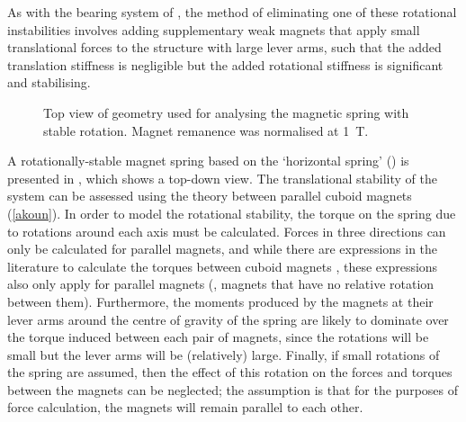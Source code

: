 \documentclass[11pt,a4paper]{memoir}
\begin{document}
As with the bearing system of \textcite{delamare1994-ietm}, the method of eliminating one of these rotational instabilities involves adding supplementary weak magnets that apply small translational forces to the structure with large lever arms, such that the added translation stiffness is negligible but the added rotational stiffness is significant and stabilising.


\begin{figure}
  \begin{subfigure}[0.4]
  \end{subfigure}\hfil
  \begin{subfigure}[0.4]
  \end{subfigure}
  \caption[Geometry used for analysing the magnetic spring with stable rotation.]{Top view of geometry used for analysing the magnetic spring with stable rotation. Magnet remanence was normalised at \SI{1}{T}.}
\end{figure}

A rotationally-stable magnet spring based on the `horizontal spring' () is presented in , which shows a top-down view.
The translational stability of the system can be assessed using the theory between parallel cuboid magnets (\eqref{akoun}).
In order to model the rotational stability, the torque on the spring due to rotations around each axis must be calculated.
Forces in three directions can only be calculated for parallel magnets, and while there are expressions in the literature to calculate the torques between cuboid magnets \cite{janssen2010-ietm}, these expressions also only apply for parallel magnets (\ie, magnets that have no relative rotation between them).
Furthermore, the moments produced by the magnets at their lever arms around the centre of gravity of the spring are likely to dominate over the torque induced between each pair of magnets, since the rotations will be small but the lever arms will be (relatively) large.
Finally, if small rotations of the spring are assumed, then the effect of this rotation on the forces and torques between the magnets can be neglected; the assumption is that for the purposes of force calculation, the magnets will remain parallel to each other.
\end{document}
